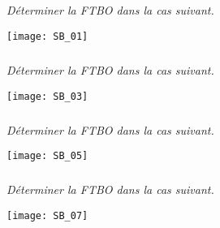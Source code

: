 \setcounter{exo}{0}
\subparagraph{}\textit{Déterminer la FTBO dans la cas suivant.}
\begin{center}
\texttt{[image: SB\_01]}
\end{center}

\subparagraph{}\textit{Déterminer la FTBO dans la cas suivant.}
\begin{center}
\texttt{[image: SB\_03]}
\end{center}

\subparagraph{}\textit{Déterminer la FTBO dans la cas suivant.}
\begin{center}
\texttt{[image: SB\_05]}
\end{center}

\subparagraph{}\textit{Déterminer la FTBO dans la cas suivant.}
\begin{center}
\texttt{[image: SB\_07]}
\end{center}